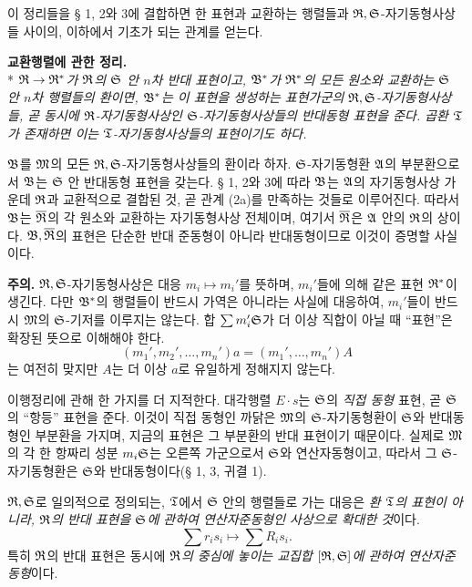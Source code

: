 이 정리들을 § 1, 2와 3에 결합하면 한 표현과 교환하는 행렬들과 \(\mathfrak R,\mathfrak S\)-자기동형사상들 사이의, 이하에서 기초가 되는 관계를 얻는다.

\noindent\textbf{교환행렬에 관한 정리.}\\*
\emph{\(\mathfrak R\to\mathfrak R^*\)가 \(\mathfrak R\)의 \(\mathfrak S\) 안 \(n\)차 반대 표현이고, \(\mathfrak B^*\)가 \(\mathfrak R^*\)의 모든 원소와 교환하는 \(\mathfrak S\) 안 \(n\)차 행렬들의 환이면, \(\mathfrak B^*\)는 이 표현을 생성하는 표현가군의 \(\mathfrak R,\mathfrak S\)-자기동형사상들, 곧 동시에 \(\mathfrak R\)-자기동형사상인 \(\mathfrak S\)-자기동형사상들의 반대동형 표현을 준다. 곱환 \(\mathfrak T\)가 존재하면 이는 \(\mathfrak T\)-자기동형사상들의 표현이기도 하다.}

\(\mathfrak B\)를 \(\mathfrak M\)의 모든 \(\mathfrak R,\mathfrak S\)-자기동형사상들의 환이라 하자. \(\mathfrak S\)-자기동형환 \(\mathfrak A\)의 부분환으로서 \(\mathfrak B\)는 \(\mathfrak S\) 안 반대동형 표현을 갖는다. § 1, 2와 3에 따라 \(\mathfrak B\)는 \(\mathfrak A\)의 자기동형사상 가운데 \(\mathfrak R\)과 교환적으로 결합된 것, 곧 관계 (2a)를 만족하는 것들로 이루어진다. 따라서 \(\mathfrak B\)는 \(\overline{\mathfrak R}\)의 각 원소와 교환하는 자기동형사상 전체이며, 여기서 \(\overline{\mathfrak R}\)은 \(\mathfrak A\) 안의 \(\mathfrak R\)의 상이다. \(\mathfrak B,\overline{\mathfrak R}\)의 표현은 단순한 반대 준동형이 아니라 반대동형이므로 이것이 증명할 사실이다.

\noindent\textbf{주의.} \(\mathfrak R,\mathfrak S\)-자기동형사상은 대응 \(m_i\mapsto m_i'\)를 뜻하며, \(m_i'\)들에 의해 같은 표현 \(\mathfrak R^*\)이 생긴다. 다만 \(\mathfrak B^*\)의 행렬들이 반드시 가역은 아니라는 사실에 대응하여, \(m_i'\)들이 반드시 \(\mathfrak M\)의 \(\mathfrak S\)-기저를 이루지는 않는다. 합 \(\sum m_i'\mathfrak S\)가 더 이상 직합이 아닐 때 “표현”은 확장된 뜻으로 이해해야 한다.
\[
(m_1',m_2',\ldots,m_n')a=(m_1',\ldots,m_n')A
\]
는 여전히 맞지만 \(A\)는 더 이상 \(a\)로 유일하게 정해지지 않는다.

이행정리에 관해 한 가지를 더 지적한다. 대각행렬 \(E\cdot s\)는 \(\mathfrak S\)의 \emph{직접 동형} 표현, 곧 \(\mathfrak S\)의 “항등” 표현을 준다. 이것이 직접 동형인 까닭은 \(\mathfrak M\)의 \(\mathfrak S\)-자기동형환이 \(\mathfrak S\)와 반대동형인 부분환을 가지며, 지금의 표현은 그 부분환의 반대 표현이기 때문이다. 실제로 \(\mathfrak M\)의 각 한 항짜리 성분 \(m_i\mathfrak S\)는 오른쪽 가군으로서 \(\mathfrak S\)와 연산자동형이고, 따라서 그 \(\mathfrak S\)-자기동형환은 \(\mathfrak S\)와 반대동형이다(§ 1, 3, 귀결 1).

\(\mathfrak R,\mathfrak S\)로 일의적으로 정의되는, \(\mathfrak T\)에서 \(\mathfrak S\) 안의 행렬들로 가는 대응은 \emph{환 \(\mathfrak T\)의 표현이 아니라, \(\mathfrak R\)의 반대 표현을 \(\mathfrak S\)에 관하여 연산자준동형인 사상으로 확대한 것}이다.
\[
\sum r_i s_i\longmapsto\sum R_i s_i.
\]
특히 \(\mathfrak R\)의 반대 표현은 동시에 \emph{\(\mathfrak R\)의 중심에 놓이는 교집합 \([\mathfrak R,\mathfrak S]\)에 관하여 연산자준동형}이다.

